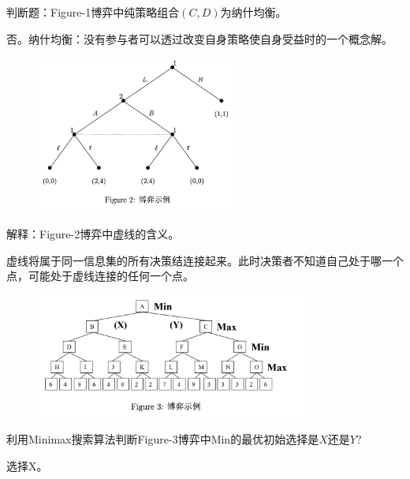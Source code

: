 \begin{problem}
	判断题：Figure-1博弈中纯策略组合$(C,D)$为纳什均衡。
\end{problem}
\begin{solution}
	否。纳什均衡：没有参与者可以透过改变自身策略使自身受益时的一个概念解。
\end{solution}

\begin{figure}[htbp]
	\centering\label{fig:2}
	\includegraphics[width=0.6\textwidth]{./figure/fig2.png}
\end{figure}

\begin{problem}
	解释：Figure-2博弈中虚线的含义。
\end{problem}
\begin{solution}
	虚线将属于同一信息集的所有决策结连接起来。此时决策者不知道自己处于哪一个点，可能处于虚线连接的任何一个点。
\end{solution}

\begin{figure}[htbp]
	\centering\label{fig:3}
	\includegraphics[width=0.8\textwidth]{./figure/fig3.png}
\end{figure}

\begin{problem}
	利用Minimax搜索算法判断Figure-3博弈中Min的最优初始选择是$X$还是$Y$?
\end{problem}
\begin{solution}
	选择X。
\end{solution}



